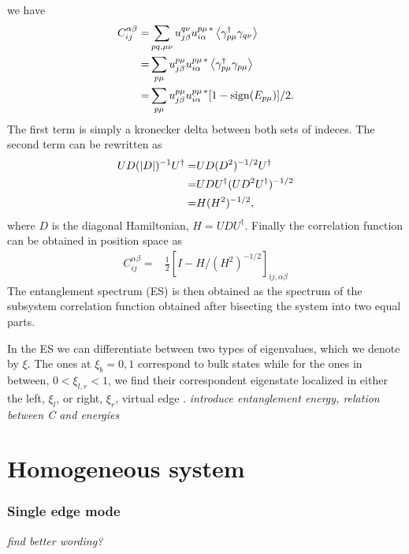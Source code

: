 \documentclass[twocolumn,amsmath,longbibliography,amssymb,superscriptaddress]{revtex4-1}
\newcommand{\mariac}[1]{{\it\color{cyan}#1}}
\begin{document}
we have
\begin{align*}
C_{ij}^{\alpha \beta} =& \sum_{pq,\mu\nu} u^{q\nu }_{j\beta} u^{p\mu \, \ast}_{i\alpha} \expval{\gamma^\dagger_{p\mu} \gamma_{q\nu} } \\
=&  \sum_{p\mu} u^{p\mu }_{j\beta} u^{p\mu \, \ast}_{i\alpha} \expval{\gamma^\dagger_{p\mu} \gamma_{p\mu} } \\
=&  \sum_{p\mu} u^{p\mu }_{j\beta} u^{p\mu \, \ast}_{i\alpha} [1-{\rm sign}(E_{p\mu})]/2.
\end{align*}
The first term is simply a kronecker delta between both sets of indeces. The second term can be rewritten as
\begin{align*}
UD(\abs{D})^{-1}U^\dagger =& UD(D^2)^{-1/2}U^\dagger \\
=& U D U^\dagger (U D^2 U^\dagger)^{-1/2} \\
=& H(H^2)^{-1/2},
\end{align*}
where $D$ is the diagonal Hamiltonian, $H=UDU^\dagger$. Finally the correlation function can be obtained in position space as
\begin{align*}
C_{ij}^{\alpha \beta} =& \frac{1}{2}\left[I - H/ (H^2)^{-1/2} \right]_{ij, \alpha \beta}
\end{align*}
The entanglement spectrum (ES) is then obtained as the spectrum of the subsystem correlation function obtained after bisecting the system into two equal parts. 

In the ES we can differentiate between two types of eigenvalues, which we denote by $\xi$. The ones at $\xi_b = 0,1$ correspond to bulk states while for the ones in between, $0<\xi_{l,r}<1$, we find their correspondent eigenstate localized in either the left, $\xi_l$, or right, $\xi_r$, virtual edge \cite{Peschel2008}. 
\mariac{introduce entanglement energy, relation between C and energies}
\section{Homogeneous system}

\subsubsection{Single edge mode}
\mariac{find better wording?}
\end{document}
